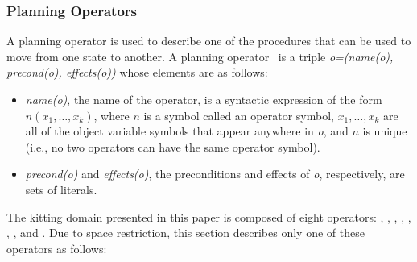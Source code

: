 \subsubsection{Planning Operators}
\label{subsect:Planning_Operators}

A planning operator is used to describe one of the procedures that can be used to move from one state to another. A planning operator~\cite{NAU.2004} is a triple \textit{o=(name(o), precond(o), effects(o))}
whose elements are as follows:
\begin{itemize}
\item \textit{name(o)}, the name of the operator, is a syntactic expression of the form $n(x_1,\dots,x_k)$, where $n$ is a symbol called an operator symbol, $x_1,\dots,x_k$ are all of the object variable symbols that
appear anywhere in \textit{o}, and $n$ is unique (i.e., no two operators can have the
same operator symbol).
\item \textit{precond(o)} and \textit{effects(o)}, the preconditions and effects of \textit{o}, respectively, are sets of literals.
\end{itemize}


The kitting domain presented in this paper is composed of eight operators: , , , , , , , and . Due to space restriction, this section describes only one of these operators as follows:

